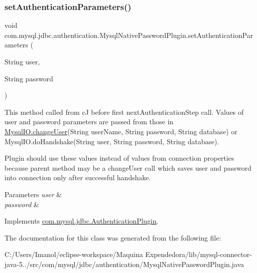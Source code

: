 \subsubsection{\texorpdfstring{set\+Authentication\+Parameters()}{setAuthenticationParameters()}}
{\footnotesize\ttfamily void com.\+mysql.\+jdbc.\+authentication.\+Mysql\+Native\+Password\+Plugin.\+set\+Authentication\+Parameters (\begin{DoxyParamCaption}\item[{String}]{user,  }\item[{String}]{password }\end{DoxyParamCaption})}

This method called from cJ before first next\+Authentication\+Step call. Values of user and password parameters are passed from those in \mbox{\hyperlink{classcom_1_1mysql_1_1jdbc_1_1_mysql_i_o_a2b65fc2cb7cccdb5923da263d37019ad}{Mysql\+I\+O.\+change\+User}}(String user\+Name, String password, String database) or Mysql\+I\+O.\+do\+Handshake(String user, String password, String database).

Plugin should use these values instead of values from connection properties because parent method may be a change\+User call which saves user and password into connection only after successful handshake.


\begin{DoxyParams}{Parameters}
{\em user} & \\
\hline
{\em password} & \\
\hline
\end{DoxyParams}


Implements \mbox{\hyperlink{interfacecom_1_1mysql_1_1jdbc_1_1_authentication_plugin_af47d83abdb04823681f23b027ec19379}{com.\+mysql.\+jdbc.\+Authentication\+Plugin}}.



The documentation for this class was generated from the following file\+:\begin{DoxyCompactItemize}
\item 
C\+:/\+Users/\+Imanol/eclipse-\/workspace/\+Maquina Expendedora/lib/mysql-\/connector-\/java-\/5../src/com/mysql/jdbc/authentication/Mysql\+Native\+Password\+Plugin.\+java\end{DoxyCompactItemize}
